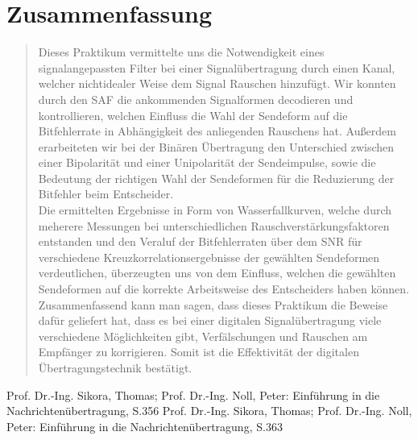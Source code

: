 \section{Zusammenfassung}
\begin{quote}

    Dieses Praktikum vermittelte uns die Notwendigkeit eines signalangepassten
    Filter bei einer Signalübertragung durch einen Kanal, welcher nichtidealer
    Weise dem Signal Rauschen hinzufügt. Wir konnten durch den SAF die
    ankommenden Signalformen decodieren und kontrollieren, welchen Einfluss die
    Wahl der Sendeform auf die Bitfehlerrate in Abhängigkeit des anliegenden
    Rauschens hat. Außerdem erarbeiteten wir bei der Binären Übertragung den
    Unterschied zwischen einer Bipolarität und einer Unipolarität der
    Sendeimpulse, sowie die Bedeutung der richtigen Wahl der Sendeformen für die
    Reduzierung der Bitfehler beim Entscheider.\\
    
    Die ermittelten Ergebnisse in Form von Wasserfallkurven, welche durch
    meherere Messungen bei unterschiedlichen Rauschverstärkungsfaktoren
    entstanden und den Veraluf der Bitfehlerraten über dem SNR für
    verschiedene Kreuzkorrelationsergebnisse der gewählten
    Sendeformen verdeutlichen, überzeugten uns von dem Einfluss, welchen die
    gewählten Sendeformen auf die korrekte Arbeitsweise des Entscheiders haben
    können.\\
   
    Zusammenfassend kann man sagen, dass dieses Praktikum die Beweise
    dafür geliefert hat, dass es bei einer digitalen Signalübertragung viele
    verschiedene Möglichkeiten gibt, Verfälschungen und Rauschen am Empfänger
    zu korrigieren.
    Somit ist die Effektivität der digitalen Übertragungstechnik bestätigt.
    
\end{quote}%
         



\begin{thebibliography}{999}
       Prof. Dr.-Ing. Sikora, Thomas; Prof. Dr.-Ing. Noll, Peter: Einführung in die
      Nachrichtenübertragung, S.356
       Prof. Dr.-Ing. Sikora, Thomas; Prof. Dr.-Ing. Noll, Peter: Einführung in die
      Nachrichtenübertragung, S.363
%      



\end{thebibliography}


        
